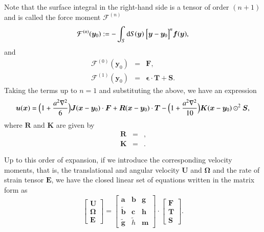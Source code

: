 \documentclass{book}
\begin{document}
Note that the surface integral in the right-hand side
is a tensor of order $(n+1)$ and
is called the force moment $\mathcal{F}^{(n)}$
\begin{equation}
  \mathcal{F}^{(n)}
  (\bm{y}_0)
  :=
  -
  \int_S
  {\rm d}S(\bm{y})\ 
  \Bigl[
    \bm{y}
    -
    \bm{y}_0
  \Bigr]^n
  \bm{f}(\bm{y})
  ,
\end{equation}
and
\begin{eqnarray}
  \mathcal{F}^{(0)}
  (\bm{y}_0)
  &=&
  \bm{F}
  ,\\
  \mathcal{F}^{(1)}
  (\bm{y}_0)
  &=&
  \bm{\epsilon}
  \cdot
  \bm{T}
  +
  \bm{S}
  .
\end{eqnarray}
Taking the terms up to $n=1$ and substituting the above,
we have an expression\cite{DurlofskyEtal1987}
\begin{equation}
  \bm{u}
  (\bm{x})
  =
  \Bigl(
    1
    +
    \frac{a^2\nabla^2}{6}
  \Bigr)
  \bm{J}
  (\bm{x}-\bm{y}_0)
  \cdot
  \bm{F}
  +
  \bm{R}
  (\bm{x}-\bm{y}_0)
  \cdot
  \bm{T}
  -
  \Bigl(
    1
    +
    \frac{a^2\nabla^2}{10}
  \Bigr)
  \bm{K}
  (\bm{x}-\bm{y}_0)
  \odot^2
  \bm{S}
  ,
\end{equation}
where $\bm{R}$ and $\bm{K}$ are given by
\begin{eqnarray}
  \bm{R}
  &=&
  ,\\
  \bm{K}
  &=&
  .
\end{eqnarray}


Up to this order of expansion,
if we introduce the corresponding velocity moments, that is,
the translational and angular velocity $\bm{U}$ and $\bm{\Omega}$
and the rate of strain tensor $\bm{E}$,
we have the closed linear set of equations
written in the matrix form as
\begin{equation}
  \left[
    \begin{array}{c}
      \bm{U}\\
      \bm{\Omega}\\
      \bm{E}
    \end{array}
  \right]
  =
  \left[
    \begin{array}{ccc}
      \bm{a} & \bm{b} & \bm{g}\\
      \tilde{\bm{b}} & \bm{c} & \bm{h}\\
      \tilde{\bm{g}} & \tilde{h} & \bm{m}
    \end{array}
  \right]
  \cdot
  \left[
    \begin{array}{c}
      \bm{F}\\
      \bm{T}\\
      \bm{S}
    \end{array}
  \right]
  .
  \label{eq:mob-fts}
\end{equation}
\end{document}
